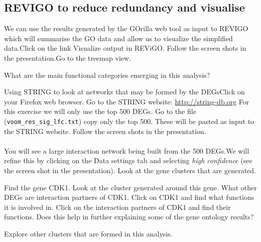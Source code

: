 \subsection{REVIGO to reduce redundancy and visualise}We can use the results generated by the GOrilla web tool as input to REVIGO which will summarise the GO data and allow us to visualize the simplified data.Click on the link Visualize output in REViGO. Follow the screen shots in the presentation.Go to the treemap view.

\begin{questions}
What are the main functional categories emerging in this analysis?
\begin{answer}

\end{answer}

Using STRING to look at networks that may be formed by the DEGsClick on your Firefox web browser.  Go to the STRING website: \url{http://string-db.org}
For this exercise we will only use the top 500 DEGs. Go to the file (\texttt{voom\_res\_sig\_lfc.txt}) copy only the top 500. These will be pasted as input to the STRING website. Follow the screen shots in the presentation.\\\\You will see a large interaction network being built from the 500 DEGs.We will refine this by clicking on the Data settings tab and selecting \emph{high confidence} (see the screen shot in the presentation).
Look at the gene clusters that are generated.
\end{questions}

\begin{questions}
Find the gene CDK1. Look at the cluster generated around this gene. What other DEGs are interaction partners of CDK1.  Click on CDK1 and find what functions it is involved in. Click on the interaction partners of CDK1 and find their functions. Does this help in further explaining some of the gene ontology results?
\begin{answer}
Explore other clusters that are formed in this analysis.
\end{answer}
 
\end{questions}

